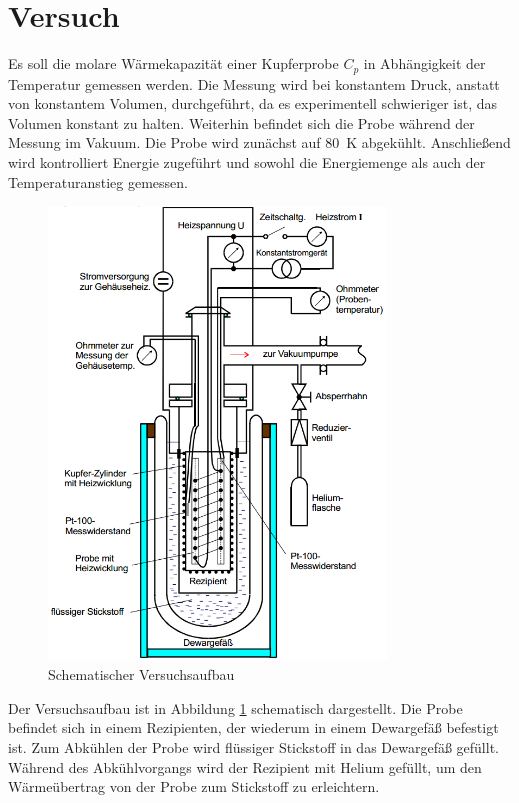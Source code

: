 \section{Versuch}

Es soll die molare Wärmekapazität einer Kupferprobe $C_p$ in Abhängigkeit der Temperatur gemessen werden.
Die Messung wird bei konstantem Druck, anstatt von konstantem Volumen, durchgeführt, da es experimentell schwieriger ist, das Volumen konstant zu halten.
Weiterhin befindet sich die Probe während der Messung im Vakuum.
Die Probe wird zunächst auf \SI{80}{\kelvin} abgekühlt.
Anschließend wird kontrolliert Energie zugeführt und sowohl die Energiemenge als auch der Temperaturanstieg gemessen.

\begin{figure}
	\centering
	\includegraphics[width=0.8\textwidth]{img/aufbau.png}
	\caption{Schematischer Versuchsaufbau \cite{v47}}
	\label{fig:aufbau}
\end{figure}

Der Versuchsaufbau ist in Abbildung \ref{fig:aufbau} schematisch dargestellt.
Die Probe befindet sich in einem Rezipienten, der wiederum in einem Dewargefäß befestigt ist.
Zum Abkühlen der Probe wird flüssiger Stickstoff in das Dewargefäß gefüllt.
Während des Abkühlvorgangs wird der Rezipient mit Helium gefüllt, um den Wärmeübertrag von der Probe zum Stickstoff zu erleichtern.

